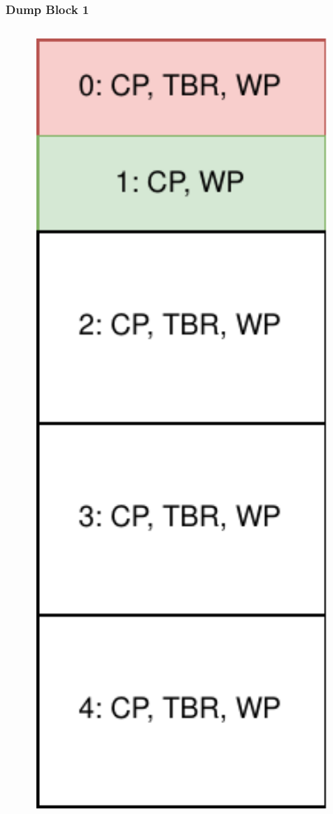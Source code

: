 \documentclass[aspectratio=169]{beamer}
\begin{document}
\begin{frame}[fragile]
	\frametitle{Dump Block 1}

	\begin{columns}
		\begin{column}{0.2\textwidth}
			\includegraphics[width=1.0\textwidth]{block1.pdf}

\end{column}
\end{columns}
\end{frame}
\end{document}
